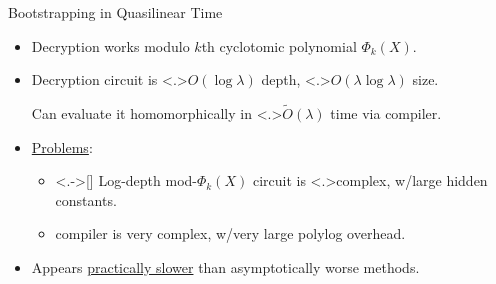 \documentclass[shadow,xcolor=pdftex,svgnames,table,t]{beamer}
\begin{document}
\begin{frame}[label=prev]{Bootstrapping in Quasilinear Time {}}
  \begin{itemize}
  \item<+-> Decryption works modulo $k$th cyclotomic polynomial
    $\Phi_{k}(X)$.

  \item<+-> Decryption circuit is \alert<.>{$O(\log \lambda)$ depth},
    \alert<.>{$O(\lambda \log \lambda)$ size}.

    \smallskip Can evaluate it homomorphically in
    \alert<.>{$\tilde{O}(\lambda)$ time} via {\citationsize
      [GHS'12a]} compiler.
     
  \item<+-> \uline{Problems}:
    \begin{itemize}
      \smallskip
    \item<.->[\RedCross] Log-depth mod-$\Phi_{k}(X)$ circuit is
      \alert<.>{complex}, w/large hidden constants.
      \smallskip
    \item<+->[\RedCross\RedCross] {\citationsize [GHS'12a]} compiler is
      \alert{very complex}, w/\alert{very large polylog overhead}.
    \end{itemize}

  \item<+->[$\Rightarrow$] Appears \uline{practically slower} than
    asymptotically worse methods.
  \end{itemize}
\end{frame}
\end{document}
